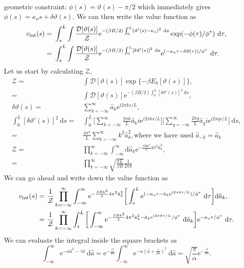 \documentclass[12pt]{article}
\def\d{\text{d}}
\def\e{\text{e}}
\def\D{\mathcal{D}}
\def\Z{\mathcal{Z}}
\def\ah{\hat{a}}
\def\theta{\vartheta}
\begin{document}
geometric constraint: $\phi(s) = \theta(s) - \pi/2$ which immediately gives $\phi(s) = \kappa_o s + \delta \theta(s)$.
We can then write the value function as
\begin{align}
    v_{\rm int}(s) =& \ \int_{s}^L \int \frac{ \D[\theta(s)]}{\mathcal{Z}}\e^{-(\beta B/2) \int_0^L (\theta'(s)-\kappa_o)^2 \ \d s} \exp(-\phi(\tau)/\phi^*) \ \d \tau, \\
    =& \ \int_{s}^L \int \frac{ \D[\theta(s)]}{\mathcal{Z}}\e^{-(\beta B/2) \int_0^L [\delta \theta'(s)]^2 \ \d s} \e^{(-\kappa_o \tau - \delta \theta(\tau))/\phi^*} \ \d \tau.
\end{align}
Let us start by calculating $\Z$,
\begin{align}
    \Z =& \ \int \mathcal{D}[\theta(s)] \exp\{ {-\beta E_b[\theta(s)]} \}, \\
    =& \ \int \mathcal{D}[\theta(s)] \e^{-(\beta B/2) \int_0^L [\delta \theta'(s)]^2 \ \d s}, \\
    \delta \theta(s) =& \ \sum_{k=-\infty}^\infty \ah_k \e^{i 2 \pi k s/L}, \\
    \int_0^L [\delta \theta'(s)]^2 \ \d s =& \ \int_0^L \bigg[ \sum_{k=-\infty}^\infty \frac{2\pi k}{L} \ah_k i \e^{i 2 \pi k s/L} \bigg]
    \bigg[ \sum_{q=-\infty}^\infty \frac{2\pi q}{L} \ah_q i \e^{i 2 \pi q s/L} \bigg] \ \d s, \\
    =& \ \frac{4\pi^2}{L} \sum_{k=-\infty}^\infty k^2 \ah_k^2, \text{where we have used } \ah_{-k} = \ah_k \\
    \Z =& \ \prod_{k=-\infty}^\infty \int_{-\infty}^{\infty} \d \ah_k \e^{-\frac{\beta B k^2}{L} 4\pi^2\ah_k^2}, \\
    =& \ \prod_{k=-\infty}^\infty \sqrt{\frac{\pi L}{\beta B}} \frac{1}{2\pi k}
\end{align}
We can go ahead and write down the value function as
\begin{align}
    v_{\rm int}(s) =& \ \frac{1}{\Z} \prod_{k=-\infty}^\infty \int_{-\infty}^{\infty} \e^{-\frac{\beta B k^2}{L} 4\pi^2 \ah_k^2} \bigg[ \int_{s}^L \e^{(-\kappa_o \tau - \ah_k \e^{i 2 \pi k \tau/L})/\phi^*} \ \d \tau \bigg] \d \ah_k, \\
    =& \ \frac{1}{\Z} \prod_{k=-\infty}^\infty \int_{s}^L \bigg[ \int_{-\infty}^{\infty} \e^{-\frac{\beta B k^2}{L} 4\pi^2 \ah_k^2  - \ah_k \e^{i 2 \pi k \tau/L}/\phi^*} \ \d \ah_k \bigg]  \e^{-\kappa_o \tau/\phi^*} \ \d \tau.
\end{align}
We can evaluate the integral inside the square brackets as
\[
    \int_{-\infty}^\infty \e^{-\alpha \ah^2 -\gamma \ah} \ \d \ah = \e^{-\frac{\gamma^2}{4\alpha}}\int_{-\infty}^\infty \e^{-\alpha(\ah + \frac{\gamma}{2 \alpha})^2} \ \d \ah
    = \sqrt{\frac{\pi}{\alpha}} \e^{-\frac{\gamma^2}{4\alpha}}.
\]
\end{document}
